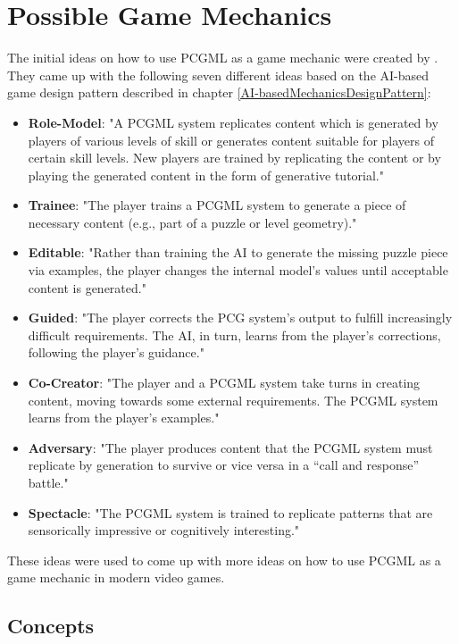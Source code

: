 \documentclass[MGS,Master,english]{twbook}%
\begin{document}
\chapter{Possible Game Mechanics}
The initial ideas on how to use PCGML as a game mechanic were created by \citep{pcgml::paper}. They came up with the following seven different ideas based on the AI-based game design pattern described in chapter \ref{AI-basedMechanicsDesignPattern}:
\begin{itemize}
	\item \textbf{Role-Model}: "A \ac{PCGML} system replicates content which is generated by players of various levels of skill or generates content suitable for players of certain skill levels. New players are trained by replicating the content or by playing the generated content in the form of generative tutorial." \cite{pcgml::paper}
	\item \textbf{Trainee}: "The player trains a \ac{PCGML} system to generate a piece of necessary content (e.g., part of a puzzle or level geometry)." \cite{pcgml::paper}
	\item \textbf{Editable}: "Rather than training the AI to generate the missing puzzle piece via examples, the player changes the internal model’s values until acceptable content is generated." \cite{pcgml::paper}
	\item \textbf{Guided}: "The player corrects the \ac{PCG} system’s output to fulfill increasingly difficult requirements. The \ac{AI}, in turn, learns from the player’s corrections, following the player’s guidance." \cite{pcgml::paper}
	\item \textbf{Co-Creator}: "The player and a \ac{PCGML} system take turns in creating content, moving towards some external requirements. The \ac{PCGML} system learns from the player’s examples." \cite{pcgml::paper} 
	\item \textbf{Adversary}: "The player produces content that the \ac{PCGML} system must replicate by generation to survive or vice versa in a “call and response” battle." \cite{pcgml::paper}
	\item \textbf{Spectacle}: "The \ac{PCGML} system is trained to replicate patterns that are sensorically impressive or cognitively interesting." \cite{pcgml::paper}
\end{itemize}
These ideas were used to come up with more ideas on how to use PCGML as a game mechanic in modern video games.

\section{Concepts}
\end{document}
